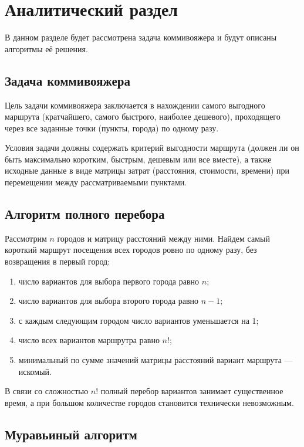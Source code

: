 \chapter{Аналитический раздел}

В данном разделе будет рассмотрена задача коммивояжера и будут описаны алгоритмы её решения.

\section{Задача коммивояжера}

Цель задачи коммивояжера \cite{info_tsp} заключается в нахождении самого выгодного маршрута (кратчайшего, самого быстрого, наиболее дешевого), проходящего через все заданные точки (пункты, города) по одному разу.

Условия задачи должны содержать критерий выгодности маршрута (должен ли он быть максимально коротким, быстрым, дешевым или все вместе), а также исходные данные в виде матрицы затрат (расстояния, стоимости, времени) при перемещении между рассматриваемыми пунктами.

\section{Алгоритм полного перебора}

Рассмотрим $n$ городов и матрицу расстояний между ними. 
Найдем самый короткий маршрут посещения всех городов ровно по одному разу, без возвращения в первый город:

\begin{enumerate}[label={\arabic*)}]
	\item число вариантов для выбора первого города равно $n$;
	\item число вариантов для выбора второго города равно $n-1$;
	\item с каждым следующим городом число вариантов уменьшается на 1;
	\item число всех вариантов маршрутра равно $n!$;
	\item минимальный по сумме значений матрицы расстояний вариант маршрута --- искомый.
\end{enumerate}

В связи со сложностью $n!$ полный перебор вариантов занимает существенное время, а при большом количестве городов становится технически невозможным.

\section{Муравьиный алгоритм}

